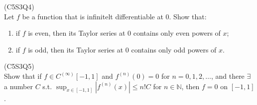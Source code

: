 \begin{prb}
    (C5S3Q4) \\
    Let $f$ be a function that is infinitelt differentiable at $0$. Show that: 
    \begin{enumerate}
        \item[a)] if $f$ is even, then its Taylor series at $0$ contains only even powers of $x$;
        \item[b)] if $f$ is odd, then its Taylor series at $0$ contains only odd powers of $x$.
    \end{enumerate}
\end{prb}

\begin{prb}
    (C5S3Q5) \\
    Show that if $f \in C^{(\infty)}[-1, 1]$ and $f^{(n)}(0) = 0$ for $n = 0, 1, 2, \ldots$, and there $\exists$ a number $C$ s.t. $\sup_{x \in [-1, 1]} |f^{(n)}(x)| 
    \leq n! C$ for $n \in \mathbb{N}$, then $f = 0$ on $[-1, 1]$. 
\end{prb}


